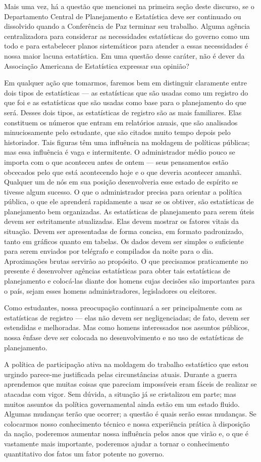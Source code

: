 \documentclass[12pt]{article}
\begin{document}
Mais uma vez, há a questão que mencionei na primeira seção deste discurso, se o Departamento Central de Planejamento e Estatística deve ser continuado ou dissolvido quando a Conferência de Paz terminar seu trabalho. Alguma agência centralizadora para considerar as necessidades estatísticas do governo como um todo e para estabelecer planos sistemáticos para atender a essas necessidades é nossa maior lacuna estatística. Em uma questão desse caráter, não é dever da Associação Americana de Estatística expressar sua opinião?

Em qualquer ação que tomarmos, faremos bem em distinguir claramente entre dois tipos de estatísticas — as estatísticas que são usadas como um registro do que foi e as estatísticas que são usadas como base para o planejamento do que será. Desses dois tipos, as estatísticas de registro são as mais familiares. Elas constituem os números que entram em relatórios anuais, que são analisados minuciosamente pelo estudante, que são citados muito tempo depois pelo historiador. Tais figuras têm uma influência na moldagem de políticas públicas; mas essa influência é vaga e intermitente. O administrador médio pouco se importa com o que aconteceu antes de ontem — seus pensamentos estão obcecados pelo que está acontecendo hoje e o que deveria acontecer amanhã. Qualquer um de nós em sua posição desenvolveria esse estado de espírito se tivesse algum sucesso. O que o administrador precisa para orientar a política pública, o que ele aprenderá rapidamente a usar se os obtiver, são estatísticas de planejamento bem organizadas. As estatísticas de planejamento para serem úteis devem ser estritamente atualizadas. Elas devem mostrar os fatores vitais da situação. Devem ser apresentadas de forma concisa, em formato padronizado, tanto em gráficos quanto em tabelas. Os dados devem ser simples o suficiente para serem enviados por telégrafo e compilados da noite para o dia. Aproximações brutas servirão ao propósito. O que precisamos praticamente no presente é desenvolver agências estatísticas para obter tais estatísticas de planejamento e colocá-las diante dos homens cujas decisões são importantes para o país, sejam esses homens administradores, legisladores ou eleitores.

Como estudantes, nossa preocupação continuará a ser principalmente com as estatísticas de registro — elas não devem ser negligenciadas; de fato, devem ser estendidas e melhoradas. Mas como homens interessados nos assuntos públicos, nossa ênfase deve ser colocada no desenvolvimento e no uso de estatísticas de planejamento.

A política de participação ativa na moldagem do trabalho estatístico que estou urgindo parece-me justificada pelas circunstâncias atuais. Durante a guerra aprendemos que muitas coisas que pareciam impossíveis eram fáceis de realizar se atacadas com vigor. Sem dúvida, a situação já se cristalizou em parte; mas muitos assuntos da política governamental ainda estão em um estado fluido. Algumas mudanças terão que ocorrer; a questão é quais serão essas mudanças. Se colocarmos nosso conhecimento técnico e nossa experiência prática à disposição da nação, poderemos aumentar nossa influência pelos anos que virão e, o que é vastamente mais importante, poderemos ajudar a tornar o conhecimento quantitativo dos fatos um fator potente no governo.
\end{document}
